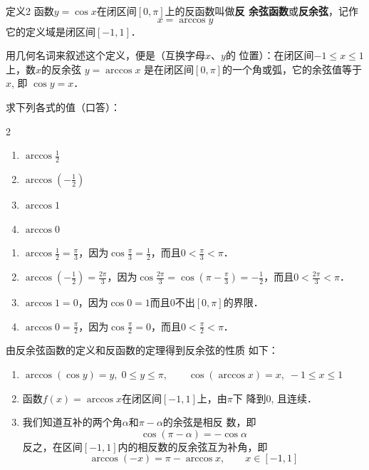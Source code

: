 \begin{blk}{定义2 }
    函数$y=\cos x$在闭区间$[0,\pi]$上的反函数叫做\textbf{反
余弦函数}或\textbf{反余弦}，记作
\[x=\arccos y\]
它的定义域是闭区间$[-1,1]$．
\end{blk}

用几何名词来叙述这个定义，便是（互换字母$x$、$y$的
位置）：在闭区间$-1\le x\le 1$上，数$x$的反余弦
$y=\arccos x$
是在闭区间$[0,\pi]$的一个角或弧，它的余弦值等于$x$, 即
$\cos y=x$．

\begin{example}
    求下列各式的值（口答）：
    \begin{multicols}{2}
\begin{enumerate}
    \item $\arccos\frac{1}{2}$
    \item $\arccos\left(-\frac{1}{2}\right)$
    \item $\arccos1$
    \item $\arccos0$
\end{enumerate}
    \end{multicols}
\end{example}

\begin{solution}
\begin{enumerate}
    \item $\arccos\frac{1}{2}=\frac{\pi}{3}$，因为$\cos\frac{\pi}{3}=\frac{1}{2}$，而且$0<\frac{\pi}{3}<\pi$．
    \item $\arccos\left(-\frac{1}{2}\right)=\frac{2\pi}{3}$，因为$\cos\frac{2\pi}{3}=\cos\left(\pi-\frac{\pi}{3}\right)=-\frac{1}{2}$，而且$0<\frac{2\pi}{3}<\pi$．
    \item $\arccos1=0$，因为$\cos 0=1$而且0不出$[0,\pi]$的界限．
    \item $\arccos0=\frac{\pi}{2}$，因为$\cos\frac{\pi}{2}=0$，而且$0<\frac{\pi}{2}<\pi$．
\end{enumerate}
\end{solution}

由反余弦函数的定义和反函数的定理得到反余弦的性质
如下：
\begin{enumerate}
\item $\arccos(\cos y)=y,\; 0\le y\le \pi,\qquad \cos(\arccos x)=x,\; -1\le x\le 1$
\item 函数$f(x)=\arccos x$在闭区间$[-1,1]$上，由$\pi$下
降到0, 且连续．
\item 我们知道互补的两个角$\alpha$和$\pi-\alpha$的余弦是相反
数，即
\[\cos(\pi-\alpha)=-\cos\alpha\]
反之，在区间$[-1,1]$内的相反数的反余弦互为补角，即
\[\arccos(-x)=\pi-\arccos x,\qquad x\in [-1,1]\]
\end{enumerate}

